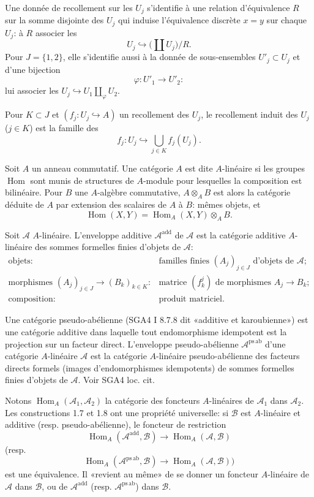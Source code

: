 \documentclass[11pt]{article}
\newcommand{\Hom}{\operatorname{Hom}}
\newcommand{\psab}{\mathrm{ps\,ab}}
\newcommand{\add}{\mathrm{add}}
\theoremstyle{deligne}
\newcommand{\para}[1]{\vspace{0.65em}\noindent{\bfseries #1}\quad}
\begin{document}
Une donnée de recollement sur les \(U_j\) s'identifie à une relation d'équivalence \(R\) sur la somme disjointe des \(U_j\) qui induise l'équivalence discrète \(x=y\) sur chaque \(U_j\): à \(R\) associer les
\[
  U_j\hookrightarrow \bigl(\coprod U_j\bigr)/R.
\]
Pour \(J=\{1,2\}\), elle s'identifie aussi à la donnée de sous-ensembles \(U'_j\subset U_j\) et d'une bijection
\[
  \varphi:U'_1\longrightarrow U'_2:
\]
lui associer les \(U_j\hookrightarrow U_1\coprod_\varphi U_2\).

Pour \(K\subset J\) et \((f_j:U_j\hookrightarrow A)\) un recollement des \(U_j\), le recollement induit des \(U_j\) (\(j\in K\)) est la famille des
\[
  f_j:U_j\hookrightarrow \bigcup_{j\in K} f_j(U_j).
\]

\para{1.6.}
Soit \(A\) un anneau commutatif. Une catégorie \(A\) est dite \(A\)-linéaire si les groupes \(\Hom\) sont munis de structures de \(A\)-module pour lesquelles la composition est bilinéaire. Pour \(B\) une \(A\)-algèbre commutative, \(A\otimes_A B\) est alors la catégorie déduite de \(A\) par extension des scalaires de \(A\) à \(B\): mêmes objets, et
\[
  \Hom(X,Y)=\Hom_A(X,Y)\otimes_A B.
\]

\para{1.7.}
Soit \(\mathcal A\) \(A\)-linéaire. L'enveloppe additive \(\mathcal A^{\add}\) de \(\mathcal A\) est la catégorie additive \(A\)-linéaire des sommes formelles finies d'objets de \(\mathcal A\):
\[
\begin{array}{rl}
\text{objets:}&\text{familles finies }(A_j)_{j\in J}\text{ d'objets de }\mathcal A;\\
\text{morphismes }(A_j)_{j\in J}\to(B_k)_{k\in K}:&
\text{matrice }(f^j_k)\text{ de morphismes }A_j\to B_k;\\
\text{composition:}&\text{produit matriciel.}
\end{array}
\]

\para{1.8.}
Une catégorie pseudo-abélienne (SGA4 I 8.7.8 dit «additive et karoubienne») est une catégorie additive dans laquelle tout endomorphisme idempotent est la projection sur un facteur direct. L'enveloppe pseudo-abélienne \(\mathcal A^{\psab}\) d'une catégorie \(A\)-linéaire \(\mathcal A\) est la catégorie \(A\)-linéaire pseudo-abélienne des facteurs directs formels (images d'endomorphismes idempotents) de sommes formelles finies d'objets de \(\mathcal A\). Voir SGA4 loc. cit.

\para{1.9.}
Notons \(\Hom_A(\mathcal A_1,\mathcal A_2)\) la catégorie des foncteurs \(A\)-linéaires de \(\mathcal A_1\) dans \(\mathcal A_2\). Les constructions 1.7 et 1.8 ont une propriété universelle: si \(\mathcal B\) est \(A\)-linéaire et additive (resp. pseudo-abélienne), le foncteur de restriction
\[
  \Hom_A(\mathcal A^{\add},\mathcal B)\longrightarrow\Hom_A(\mathcal A,\mathcal B)
\]
(resp.
\[
  \Hom_A(\mathcal A^{\psab},\mathcal B)\longrightarrow\Hom_A(\mathcal A,\mathcal B))
\]
est une équivalence. Il «revient au même» de se donner un foncteur \(A\)-linéaire de \(\mathcal A\) dans \(\mathcal B\), ou de \(\mathcal A^{\add}\) (resp. \(\mathcal A^{\psab}\)) dans \(\mathcal B\).
\end{document}
